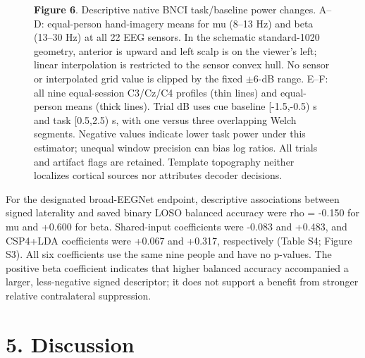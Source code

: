 \documentclass[11pt]{article}
\begin{document}
\begin{figure}[htbp]
{
}
\caption*{\textbf{Figure 6}. Descriptive native BNCI task/baseline power changes. A--D: equal-person hand-imagery means for mu (8--13 Hz) and beta (13--30 Hz) at all 22 EEG sensors. In the schematic standard-1020 geometry, anterior is upward and left scalp is on the viewer's left; linear interpolation is restricted to the sensor convex hull. No sensor or interpolated grid value is clipped by the fixed $\pm$6-dB range. E--F: all nine equal-session C3/Cz/C4 profiles (thin lines) and equal-person means (thick lines). Trial dB uses cue baseline [-1.5,-0.5) s and task [0.5,2.5) s, with one versus three overlapping Welch segments. Negative values indicate lower task power under this estimator; unequal window precision can bias log ratios. All trials and artifact flags are retained. Template topography neither localizes cortical sources nor attributes decoder decisions.}
\end{figure}
For the designated broad-EEGNet endpoint, descriptive associations between signed laterality and saved binary LOSO balanced accuracy were rho = -0.150 for mu and +0.600 for beta. Shared-input coefficients were -0.083 and +0.483, and CSP4+LDA coefficients were +0.067 and +0.317, respectively (Table S4; Figure S3). All six coefficients use the same nine people and have no p-values. The positive beta coefficient indicates that higher balanced accuracy accompanied a larger, less-negative signed descriptor; it does not support a benefit from stronger relative contralateral suppression.

\section*{5. Discussion}
\end{document}
